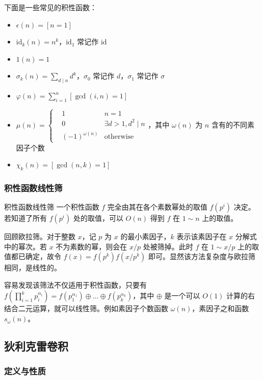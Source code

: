 \documentclass[../main.tex]{subfiles}
\begin{document}
\begin{frame}
下面是一些常见的积性函数：
\begin{itemize}
\item $\epsilon(n)=[n=1]$\pause
\item $\text{id}_k(n)=n^k$，$\text{id}_1$ 常记作 $\text{id}$\pause
\item $1(n)=1$\pause
\item $\sigma_k(n)=\sum\limits_{d\mid n}d^k$，$\sigma_0$ 常记作 $d$，$\sigma_1$ 常记作 $\sigma$\pause
\item $\varphi(n)=\sum\limits_{i=1}^n[\gcd(i,n)=1]$\pause
\item $\mu(n)=\left\{\begin{aligned}&1 &n=1\\&0 &\exists d>1,d^2\mid n\\&(-1)^{\omega(n)} &\text{otherwise} \end{aligned} \right.$，其中 $\omega(n)$ 为 $n$ 含有的不同素因子个数\pause
\item $\chi_k(n)=[\gcd(n,k)=1]$
\end{itemize}
\end{frame}

\subsubsection{积性函数线性筛}

\begin{frame}{积性函数线性筛}
一个积性函数 $f$ 完全由其在各个素数幂处的取值 $f(p^i)$ 决定。若知道了所有 $f(p^i)$ 处的取值，可以 $O(n)$ 得到 $f$ 在 $1\sim n$ 上的取值。\pause

回顾欧拉筛。对于整数 $x$，记 $p$ 为 $x$ 的最小素因子，$k$ 表示该素因子在 $x$ 分解式中的幂次。若 $x$ 不为素数的幂，则会在 $x/p$ 处被筛掉。此时 $f$ 在 $1\sim x/p$ 上的取值都已确定，故令 $f(x)=f(p^k)f(x/p^k)$ 即可。显然该方法复杂度与欧拉筛相同，是线性的。\pause

容易发现该筛法不仅适用于积性函数，只要有 $f(\prod\limits_{i=1}^k p_i^{\alpha_i})=f(p_1^{\alpha_1})\oplus\dots\oplus f(p_k^{\alpha_k})$，其中 $\oplus$ 是一个可以 $O(1)$ 计算的右结合二元运算，就可以线性筛。例如素因子个数函数 $\omega(n)$，素因子之和函数 $s_{\omega}(n)$。
\end{frame}

\subsection{狄利克雷卷积}

\subsubsection{定义与性质}
\end{document}
